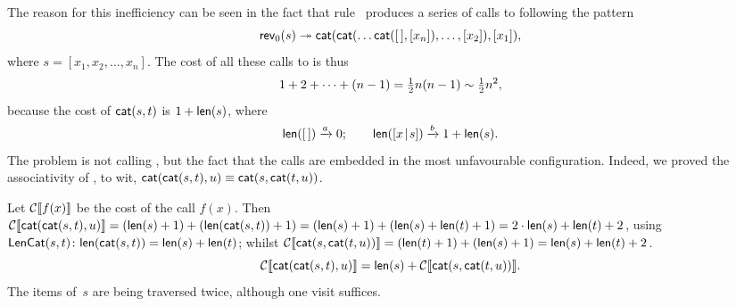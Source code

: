 The reason for this inefficiency can be seen in the fact that
rule~\clause{\delta} produces a series of calls to
 following the pattern
\begin{equation}
\textsf{rev}_0(s) \twoheadrightarrow \textsf{cat}(\textsf{cat}(\dots
\textsf{cat}([\,], [x_n]), \dots, [x_2]), [x_1]),
\label{eq:rev0}
\end{equation}
where \(s = [x_1, x_2, \dots, x_n]\). The cost of all these calls to
 is thus
\begin{equation*}
\abovedisplayskip=4pt
\belowdisplayskip=4pt
 1 + 2 + \dots + (n-1) = \tfrac{1}{2}n(n-1) \sim
\tfrac{1}{2}n^2,
\end{equation*}
because the cost of \(\textsf{cat}(s,t)\) is \(1 +
\textsf{len}(s)\), where
\begin{equation}
\textsf{len}([\,]) \xrightarrow{\smash{a}} 0;
\qquad
\textsf{len}([{x}\!\mid\!{s}]) \xrightarrow{\smash{b}} 1 + \textsf{len}(s).
\label{eq:len}
\end{equation}
The problem is not calling , but the fact that the calls
are embedded in the most unfavourable configuration. Indeed, we proved
the associativity of
 , to wit,
\(\textsf{cat}(\textsf{cat}(s,t),u) \equiv
\textsf{cat}(s,\textsf{cat}(t,u))\).

Let \(\mathcal{C}\llbracket{f(x)}\rrbracket\) be the cost of the call \(f(x)\). Then
\(\mathcal{C}\llbracket{\textsf{cat}(\textsf{cat}(s,t),u)}\rrbracket = (\textsf{len}(s) + 1) +
(\textsf{len}(\textsf{cat}(s,t)) + 1) = (\textsf{len}(s) + 1) + (\textsf{len}(s) +
\textsf{len}(t) + 1) = 2 \cdot \textsf{len}(s) + \textsf{len}(t) + 2\), using
\(\textsf{LenCat}({s,t}) \colon \textsf{len}(\textsf{cat}(s,t)) = \textsf{len}(s) +
\textsf{len}(t)\); whilst \(\mathcal{C}\llbracket{\textsf{cat}(s,\textsf{cat}(t,u))}\rrbracket =
(\textsf{len}(t) + 1) + (\textsf{len}(s) + 1) = \textsf{len}(s) + \textsf{len}(t)
+ 2\).
\begin{equation}
\mathcal{C}\llbracket{\textsf{cat}(\textsf{cat}(s,t),u)}\rrbracket = \textsf{len}(s) +
\mathcal{C}\llbracket{\textsf{cat}(s,\textsf{cat}(t,u))}\rrbracket.
\label{ineq:cat_assoc}
\end{equation}
The items of~\(s\) are being traversed twice, although one visit
suffices.

